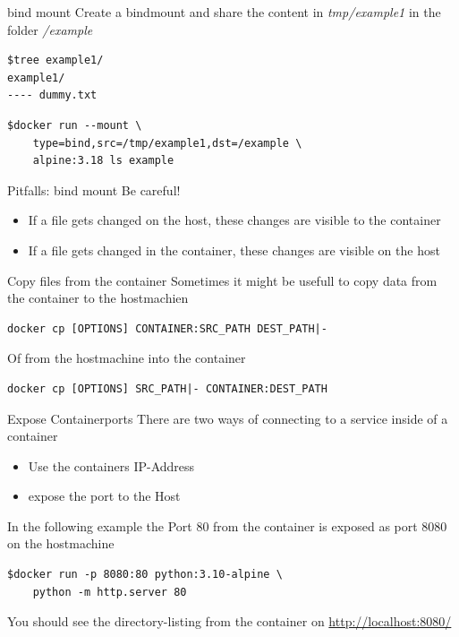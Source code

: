 \documentclass[12pt]{beamer}
\begin{document}
\begin{frame}[fragile]{bind mount}
    Create a bindmount and share the content in \emph{tmp/example1} in the folder \emph{/example}
    \begin{lstlisting}[language=OwnBash, basicstyle=\small]
$tree example1/
example1/
---- dummy.txt
    \end{lstlisting}
    \begin{lstlisting}[language=OwnBash, basicstyle=\small]
$docker run --mount \
    type=bind,src=/tmp/example1,dst=/example \
    alpine:3.18 ls example
    \end{lstlisting}
\end{frame}

\begin{frame}[fragile]{Pitfalls: bind mount}
    Be careful!
    \begin{itemize}[label=\textcolor{green}{\textbullet}]
    \item If a file gets changed on the host, these changes are visible to the container
    \end{itemize}
    \begin{itemize}[label=\textcolor{red}{\textbullet}]
    \item If a file gets changed in the container, these changes are visible on the host
    \end{itemize}
\end{frame}

\begin{frame}[fragile]{Copy files from the container}
    Sometimes it might be usefull to copy data from the container to the hostmachien
    \begin{lstlisting}[language=OwnBash, basicstyle=\small]
docker cp [OPTIONS] CONTAINER:SRC_PATH DEST_PATH|-
    \end{lstlisting}
    Of from the hostmachine into the container
    \begin{lstlisting}[language=OwnBash, basicstyle=\small]
docker cp [OPTIONS] SRC_PATH|- CONTAINER:DEST_PATH
    \end{lstlisting}
\end{frame}

\begin{frame}[fragile]{Expose Containerports}
    There are two ways of connecting to a service inside of a container
    \begin{itemize}[label=\textcolor{black}{\textbullet}]
    \item Use the containers IP-Address
    \item expose the port to the Host
    \end{itemize}
    In the following example the Port 80 from the container is exposed as port 8080 on the hostmachine
    \begin{lstlisting}[language=OwnBash, basicstyle=\small]
$docker run -p 8080:80 python:3.10-alpine \
    python -m http.server 80
    \end{lstlisting}
    You should see the directory-listing from the container on \url{http://localhost:8080/}

\end{frame}
\end{document}
